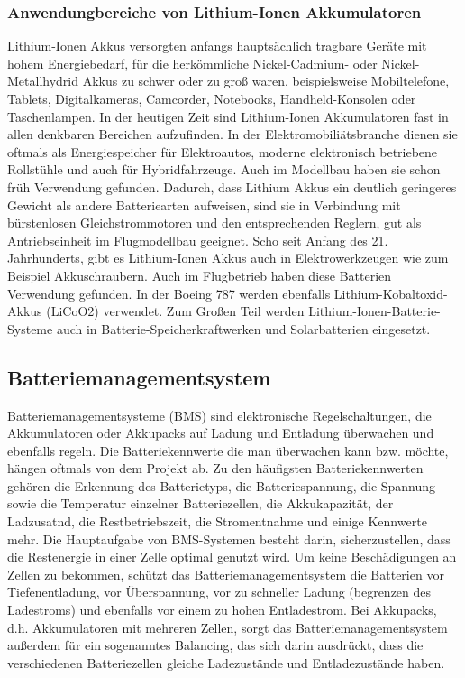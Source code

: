 \subsubsection{Anwendungbereiche von Lithium-Ionen Akkumulatoren}
Lithium-Ionen Akkus versorgten anfangs hauptsächlich tragbare Geräte mit hohem Energiebedarf, für die herkömmliche Nickel-Cadmium- oder Nickel-Metallhydrid Akkus zu schwer oder zu groß waren, beispielsweise Mobiltelefone, Tablets, Digitalkameras, Camcorder, Notebooks, Handheld-Konsolen oder Taschenlampen. In der heutigen Zeit sind Lithium-Ionen Akkumulatoren fast in allen denkbaren Bereichen aufzufinden. In der Elektromobiliätsbranche dienen sie oftmals als Energiespeicher für Elektroautos, moderne elektronisch betriebene Rollstühle und auch für Hybridfahrzeuge. Auch im Modellbau haben sie schon früh Verwendung gefunden. Dadurch, dass Lithium Akkus ein deutlich geringeres Gewicht als andere Batteriearten aufweisen, sind sie in Verbindung mit bürstenlosen Gleichstrommotoren und den entsprechenden Reglern, gut als Antriebseinheit im Flugmodellbau geeignet. Scho seit Anfang des 21. Jahrhunderts, gibt es Lithium-Ionen Akkus auch in Elektrowerkzeugen wie zum Beispiel Akkuschraubern. Auch im Flugbetrieb haben diese Batterien Verwendung gefunden. In der Boeing 787 werden ebenfalls Lithium-Kobaltoxid-Akkus (LiCoO2) verwendet. Zum Großen Teil werden Lithium-Ionen-Batterie-Systeme auch in Batterie-Speicherkraftwerken und Solarbatterien eingesetzt.
\newpage


\subsection{Batteriemanagementsystem}
Batteriemanagementsysteme (BMS) sind elektronische Regelschaltungen, die Akkumulatoren oder Akkupacks auf Ladung und Entladung überwachen und ebenfalls regeln. Die Batteriekennwerte die man überwachen kann bzw. möchte, hängen oftmals von dem Projekt ab. Zu den häufigsten Batteriekennwerten gehören die Erkennung des Batterietyps, die Batteriespannung, die Spannung sowie die Temperatur einzelner Batteriezellen, die Akkukapazität, der Ladzusatnd, die Restbetriebszeit, die Stromentnahme und einige Kennwerte mehr. Die Hauptaufgabe von BMS-Systemen besteht darin, sicherzustellen, dass die Restenergie in einer Zelle optimal genutzt wird. Um keine Beschädigungen an Zellen zu bekommen, schützt das Batteriemanagementsystem die Batterien vor Tiefenentladung, vor Überspannung, vor zu schneller Ladung (begrenzen des Ladestroms) und ebenfalls vor einem zu hohen Entladestrom. Bei Akkupacks, d.h. Akkumulatoren mit mehreren Zellen, sorgt das Batteriemanagementsystem außerdem für ein sogenanntes Balancing, das sich darin ausdrückt, dass die verschiedenen Batteriezellen gleiche Ladezustände und Entladezustände haben.

